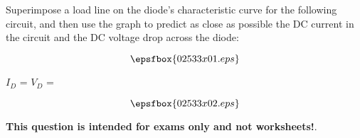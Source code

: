 

Superimpose a load line on the diode's characteristic curve for the following circuit, and then use the graph to predict as close as possible the DC current in the circuit and the DC voltage drop across the diode:

$$\epsfbox{02533x01.eps}$$

$I_D$ = \hskip 80pt $V_D$ = 







$$\epsfbox{02533x02.eps}$$







{\bf This question is intended for exams only and not worksheets!}.




